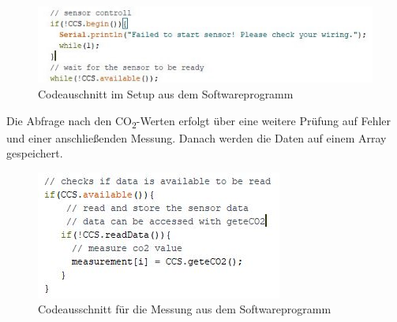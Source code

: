 \begin{figure}[!hbt]
	\centering
	\includegraphics[width=0.9\linewidth]{Images/ccs811Setup}
	\caption{Codeauschnitt im Setup aus dem Softwareprogramm}
	\label{fig:Setup}
\end{figure}

Die Abfrage nach den CO\textsubscript{2}-Werten erfolgt über eine weitere Prüfung auf Fehler und einer anschließenden Messung. Danach werden die Daten auf einem Array gespeichert.

\begin{figure}[!hbt]
	\centering
	\includegraphics[width=0.5\linewidth]{Images/ccs811Loop}
	\caption{Codeausschnitt für die Messung aus dem Softwareprogramm}
	\label{fig:Loop}
\end{figure}

